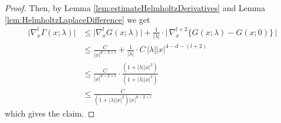 \begin{proof}
    Then, by Lemma \ref{lem:estimateHelmholtzDerivatives} and Lemma \ref{lem:HelmholtzLaplaceDifference} we get
    \begin{align*}
      \big|\nabla_x^l \Gamma(x; \lambda) \big|
      &\leq \big|\nabla_x^l G(x; \lambda) \big| 
      + \frac{1}{|\lambda|} \cdot \Big|\,\nabla_x^{l + 2} \Big\{ G(x; \lambda) - G(x; 0) \Big\}\,\Big| \\
      &\leq \frac{C}{|x|^{d - 2 + l}} + \frac{1}{|\lambda|} \cdot C\, |\lambda| |x|^{4 - d - (l + 2)} \\
      &\leq \frac{C}{|x|^{d - 2 + l}}\cdot  \frac{(1 + |\lambda| |x|^2)}{(1 + |\lambda| |x|^2)} \\
      &\leq \frac{C}{(1 + |\lambda| |x|^2) |x|^{d - 2 + l}}
    \end{align*}
    which gives the claim.
  \end{proof}



